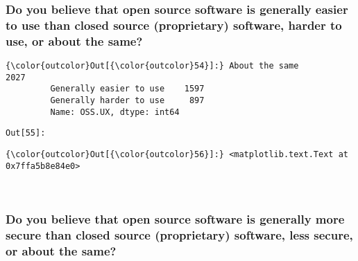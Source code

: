 \documentclass[11pt]{article}
\begin{document}
    \subsubsection{Do you believe that open source software is generally
easier to use than closed source (proprietary) software, harder to use,
or about the
same?}\label{do-you-believe-that-open-source-software-is-generally-easier-to-use-than-closed-source-proprietary-software-harder-to-use-or-about-the-same}


            \begin{Verbatim}[commandchars=\\\{\}]
{\color{outcolor}Out[{\color{outcolor}54}]:} About the same             2027
         Generally easier to use    1597
         Generally harder to use     897
         Name: OSS.UX, dtype: int64
\end{Verbatim}
        
\texttt{\color{outcolor}Out[{\color{outcolor}55}]:}
    

    


            \begin{Verbatim}[commandchars=\\\{\}]
{\color{outcolor}Out[{\color{outcolor}56}]:} <matplotlib.text.Text at 0x7ffa5b8e84e0>
\end{Verbatim}
        
    \begin{center}
    \end{center}
    { \hspace*{\fill} \\}
    
    \subsubsection{Do you believe that open source software is generally
more secure than closed source (proprietary) software, less secure, or
about the
same?}\label{do-you-believe-that-open-source-software-is-generally-more-secure-than-closed-source-proprietary-software-less-secure-or-about-the-same}
\end{document}
